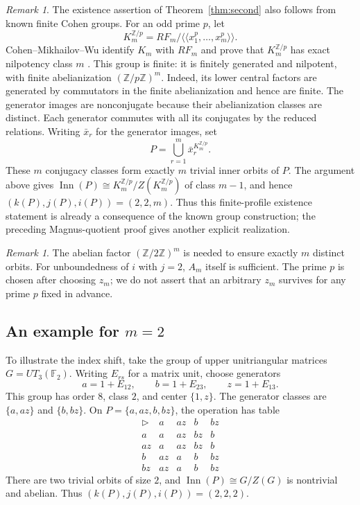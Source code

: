 \documentclass[11pt,a4paper]{article}
\theoremstyle{definition}
\theoremstyle{remark}
\newtheorem{remark}[theorem]{Remark}
\newcommand{\Inn}{\operatorname{Inn}}
\newcommand{\Z}{\mathbb Z}
\newcommand{\F}{\mathbb F}
\newcommand{\conj}{\triangleright}
\begin{document}
\begin{remark}\label{rmk:cohen}
The existence assertion of Theorem~\ref{thm:second} also follows from
known finite Cohen groups. For an odd prime \(p\), let
\[
 K_m^{\Z/p}=RF_m/\langle\!\langle x_1^p,\ldots,x_m^p\rangle\!\rangle.
\]
Cohen--Mikhailov--Wu identify \(K_m\) with \(RF_m\) and prove that
\(K_m^{\Z/p}\) has exact nilpotency class \(m\)
\cite[Sections~1--2]{CMW}. This group is finite: it is finitely generated
and nilpotent, with finite abelianization \((\Z/p\Z)^m\).
Indeed, its lower central factors are generated by commutators in the
finite abelianization and hence are finite. The generator images are
nonconjugate because their abelianization classes are distinct.
Each generator commutes with all its conjugates by the reduced relations.
Writing \(\bar x_r\) for the generator images, set
\[
 P=\bigcup_{r=1}^{m}\bar x_r^{K_m^{\Z/p}}.
\]
These \(m\) conjugacy classes form exactly \(m\) trivial inner orbits of \(P\). The argument above gives \(\Inn(P)\cong K_m^{\Z/p}/Z(K_m^{\Z/p})\)
of class \(m-1\), and hence \((k(P),j(P),i(P))=(2,2,m)\).
Thus this finite-profile existence statement is already a consequence of
the known group construction; the preceding Magnus-quotient proof gives
another explicit realization.
\end{remark}

\begin{remark}
The abelian factor \((\Z/2\Z)^m\) is needed to ensure
exactly \(m\) distinct orbits.
For unboundedness of \(i\) with \(j=2\), \(A_m\) itself is sufficient.
The prime \(p\) is chosen after choosing \(z_m\);
we do not assert that an arbitrary \(z_m\) survives
for any prime \(p\) fixed in advance.
\end{remark}

\subsection{\texorpdfstring{An example for \(m=2\)}{An example for m=2}}

To illustrate the index shift, take the group of upper unitriangular
matrices \(G=UT_3(\F_2)\). Writing \(E_{rs}\) for a matrix unit,
choose generators
\[
 a=1+E_{12},\qquad b=1+E_{23},\qquad z=1+E_{13}.
\]
This group has order \(8\), class \(2\), and center \(\{1,z\}\).
The generator classes are \(\{a,az\}\) and \(\{b,bz\}\).
On \(P=\{a,az,b,bz\}\), the operation has table
\[
 \begin{array}{c|cccc}
 \conj&a&az&b&bz\\ \hline
 a&a&az&bz&b\\
 az&a&az&bz&b\\
 b&az&a&b&bz\\
 bz&az&a&b&bz
 \end{array}
\]
There are two trivial orbits of size \(2\),
and \(\Inn(P)\cong G/Z(G)\) is nontrivial and abelian.
Thus \((k(P),j(P),i(P))=(2,2,2)\).
\end{document}
